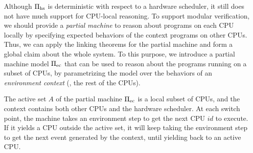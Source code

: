 Although $\Pi_{\text{hs}}$ is deterministic
with respect to a hardware scheduler,
it still does not have much support for CPU-local reasoning.
To support modular verification, 
we should provide a \emph{partial machine}
 to reason about programs on each CPU locally by specifying
expected behaviors of the context programs on other CPUs. Thus,
we can apply the linking theorems for the partial machine
 and 
 form a global
claim about the whole system. 
To this purpose, we introduce a partial
machine model $\Pi_{\text{ec}}$ that can be used to reason about the
programs running on a subset of CPUs, by
parametrizing the model over the behaviors of an \emph{environment context}
(\ie, the rest of the CPUs).

The active set $A$ of the partial machine  $\Pi_{\text{ec}}$
is a local subset of CPUs,
and the context contains
both other CPUs and the hardware scheduler.
At each switch point,
the machine takes an environment step
to get the next CPU $id$ to execute.
If it yields a CPU outside the active set,
it will keep taking the environment step
to get the next event generated
by the context, until yielding back to an active CPU.

